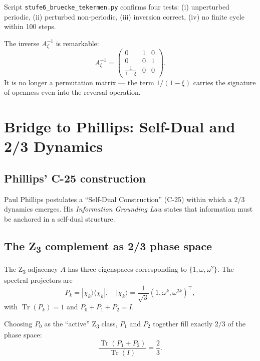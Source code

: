 Script \texttt{stufe6\_bruecke\_tekermen.py} confirms four tests: (i) unperturbed periodic, (ii) perturbed non-periodic, (iii) inversion correct, (iv) no finite cycle within 100 steps.

The inverse \(A_\xi^{-1}\) is remarkable:
\begin{equation}
A_\xi^{-1} = \begin{pmatrix} 0 & 1 & 0 \\ 0 & 0 & 1 \\ \frac{1}{1-\xi} & 0 & 0 \end{pmatrix}.
\end{equation}
It is no longer a permutation matrix --- the term \(1/(1-\xi)\) carries the signature of openness even into the reversal operation.

\section{Bridge to Phillips: Self-Dual and 2/3 Dynamics}
\label{sec:phillips}

\subsection{Phillips' C-25 construction}

Paul Phillips postulates a ``Self-Dual Construction'' (C-25) within which a \(2/3\) dynamics emerges. His \emph{Information Grounding Law} states that information must be anchored in a self-dual structure.

\subsection[The Z3 complement as 2/3 phase space]{The Z\textsubscript{3} complement as 2/3 phase space}

The Z\textsubscript{3} adjacency \(A\) has three eigenspaces corresponding to \(\{1, \omega, \omega^2\}\). The spectral projectors are
\begin{equation}
P_k = |\chi_k\rangle\langle\chi_k|, \quad |\chi_k\rangle = \frac{1}{\sqrt{3}}(1, \omega^k, \omega^{2k})^\top,
\end{equation}
with \(\operatorname{Tr}(P_k) = 1\) and \(P_0 + P_1 + P_2 = I\).

\begin{keyresult}
Choosing \(P_0\) as the ``active'' Z\textsubscript{3} class, \(P_1\) and \(P_2\) together fill exactly \(2/3\) of the phase space:
\begin{equation}
\frac{\operatorname{Tr}(P_1 + P_2)}{\operatorname{Tr}(I)} = \frac{2}{3}.
\end{equation}
\end{keyresult}

